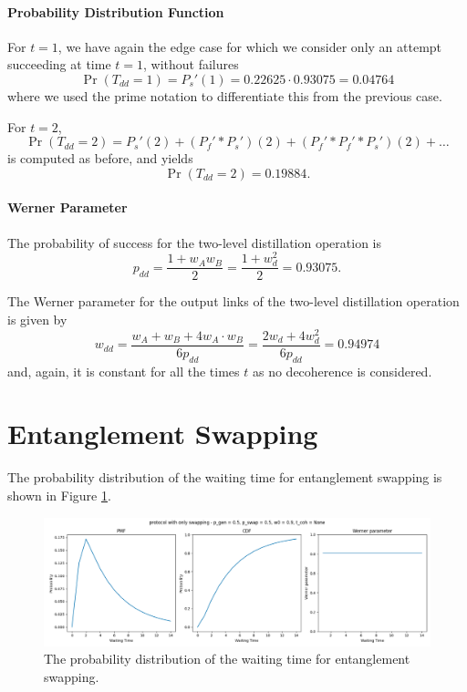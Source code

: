 \documentclass{masterthesis}
\begin{document}
\paragraph*{Probability Distribution Function}

For $t = 1$, we have again the edge case for which we consider only an attempt succeeding at time $t=1$, without failures  
\begin{equation}
    \Pr(T_{dd} = 1) = P_s'(1) = 0.22625 \cdot 0.93075 = 0.04764 
\end{equation}
where we used the prime notation to differentiate this from the previous case. 

For $t = 2$,
\begin{equation}
    \Pr(T_{dd} = 2) = P_s'(2) + (P_f' \ast P_s')(2) + (P_f' \ast P_f' \ast P_s')(2) + \ldots
\end{equation}
is computed as before, and yields
\begin{equation}
    \Pr(T_{dd} = 2) = 0.19884 .
\end{equation}

\paragraph*{Werner Parameter}

The probability of success for the two-level distillation operation is
\begin{equation}
    p_{dd} = \frac{1 + w_A w_B}{2} = \frac{1 + w_d^2}{2} = 0.93075 .
\end{equation}

The Werner parameter for the output links of the two-level distillation operation is given by
\begin{equation}
    w_{dd} = \frac{w_A + w_B + 4 w_A \cdot w_B}{6 p_{dd}} = \frac{2 w_d + 4 w_d^2}{6 p_{dd}} = 0.94974
\end{equation}
and, again, it is constant for all the times $t$ as no decoherence is considered.

\section*{Entanglement Swapping}

The probability distribution of the waiting time for entanglement swapping is shown in Figure \ref{fig:swap_waiting_time}.
\begin{figure}[ht]
    \centering
    \includegraphics[width=1\linewidth]{images/dist_tests/only swapping.png}
    \caption{The probability distribution of the waiting time for entanglement swapping.}
    \label{fig:swap_waiting_time}
\end{figure}
\end{document}
